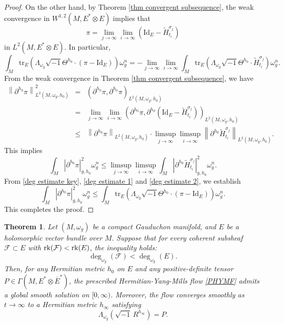 \documentclass[12pt, reqno]{amsart}
\newcommand\cF{{\mathcal F}}
\newcommand{\rk}{{\rm rk}}
\theoremstyle{plain}
\newtheorem{thm}{Theorem}[section]
\theoremstyle{definition}
\newcommand{\btheorem}{\begin{thm}}
\newcommand{\etheorem}{\end{thm}}
\newcommand{\sq}{\sqrt{-1}}
\newcommand{\p}{\partial}
\newcommand{\beq}{\begin{equation}}
\newcommand{\eeq}{\end{equation}}
\renewcommand{\tilde}{\widetilde}
\newcommand{\ts}{\otimes}
\renewcommand{\>}{\rightarrow}
\renewcommand{\>}{\rightarrow}
\renewcommand{\p}{{\partial}}
\newcommand{\vone}{ \vskip 1\baselineskip}
\newcommand{\om}{\omega}
\renewcommand{\tilde}{\widetilde}
\newcommand{\tr}{\mathrm{tr}}
\numberwithin{equation}{section} %
\begin{document}
\begin{proof}
\noindent   On the other hand, by Theorem \ref{thm convergent subsequence}, the weak convergence in $W^{1,2}(M,E^*\ts E)$ implies that
    \beq
    \pi = \lim_{j\to\infty}\lim_{i\to\infty}\left(\mathrm{Id}_E-\tilde H_{t_i}^{\sigma_j}\right)
    \eeq
    in $L^2(M,E^*\ts E)$. In particular,
    \beq
    \int_{M} \tr_E\left(\Lambda_{\om_g}\sq\Theta^{h_0}\cdot\left(\pi-\mathrm{Id}_E\right)\right)\om_g^n
    = -\lim_{j\to\infty}\lim_{i\to\infty}\int_{M}
    \tr_E\left(\Lambda_{\om_g}\sq\Theta^{h_0}\cdot\tilde H_{t_i}^{\sigma_j}\right)\om_g^n.\label{deg estimate 1}
    \eeq
    From the weak convergence in Theorem \ref{thm convergent subsequence}, we have
    \begin{eqnarray}
    \left\|\p^{h_0}\pi\right\|_{L^2(M,\omega_g, h_0)}^2
    &=& \left(\p^{h_0}\pi,\p^{h_0}\pi\right)_{L^2(M,\omega_g, h_0)}\\
    &=& \lim_{j\to\infty}\lim_{i\to\infty}
    \left(\p^{h_0}\pi,\p^{h_0}\left(\mathrm{Id}_E-\tilde H_{t_i}^{\sigma_j}\right)\right)_{L^2(M,\omega_g, h_0)}\nonumber\\
    &\leq& \left\|\p^{h_0}\pi\right\|_{L^2(M,\omega_g, h_0)}
    \cdot \limsup_{j\to\infty}\limsup_{i\to\infty} \left\|\p^{h_0} \tilde H_{t_i}^{\sigma_j} \right\|_{L^2(M,\omega_g, h_0)}.
    \end{eqnarray}
    This implies
    \beq
    \int_M \left|\partial^{h_0} \pi\right|_{g,h_0}^2 \om_g^n    \leq
    \limsup_{j\to\infty}\limsup_{i\to\infty}\int_M \left|\p^{h_0} \tilde H_{t_i}^{\sigma_j} \right|_{g,h_0}^2  \om_g^{n}.\label{deg estimate 2}
    \eeq
    From \eqref{deg estimate key}, \eqref{deg estimate 1} and \eqref{deg estimate 2}, we establish
    \beq  \int_M \left|\partial^{h_0} \pi\right|_{g,h_0}^2 \om_g^n\leq
    \int_M \tr_E\left(\Lambda_{\om_g}\sq\Theta^{h_0}\cdot\left(\pi-\mathrm{Id}_E\right)\right) \om_g^n.
        \eeq
    This completes the proof.
\end{proof}






\vone
\btheorem   Let $(M,\om_g)$ be a compact Gauduchon manifold, and $E$ be a holomorphic vector bundle over $M$.
Suppose that for every  coherent subsheaf $\cF\subset E$ with $\rk(\cF)<\rk(E)$, the inequality holds:
\beq
\deg_{\omega_g}(\cF)<\deg_{\omega_g}(E).
\eeq
Then, for any Hermitian metric $h_0$ on $E$ and any positive-definite tensor $P\in \Gamma(M,E^*\ts \overline E^*)$, the prescribed Hermitian-Yang-Mills flow \eqref{PHYMF} admits a global smooth solution on $[0,\infty)$. Moreover, the flow converges smoothly as $t\>\infty$ to a Hermitian metric  $h_\infty$ satisfying
\beq
\Lambda_{\om_g}\left(\sqrt{-1}\, R^{h_\infty}\right) = P.
\eeq
\etheorem
\end{document}
